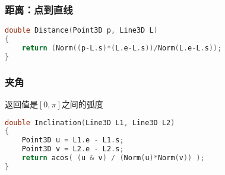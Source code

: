 	\subsubsection{距离：点到直线}
		\begin{lstlisting}[language=c++]
double Distance(Point3D p, Line3D L)
{ 
	return (Norm((p-L.s)*(L.e-L.s))/Norm(L.e-L.s)); 
} 
		\end{lstlisting}

	\subsubsection{夹角}
		返回值是$[0,\pi]$之间的弧度
		\begin{lstlisting}[language=c++]
double Inclination(Line3D L1, Line3D L2) 
{ 
	Point3D u = L1.e - L1.s; 
	Point3D v = L2.e - L2.s; 
	return acos( (u & v) / (Norm(u)*Norm(v)) ); 
} 
		\end{lstlisting}